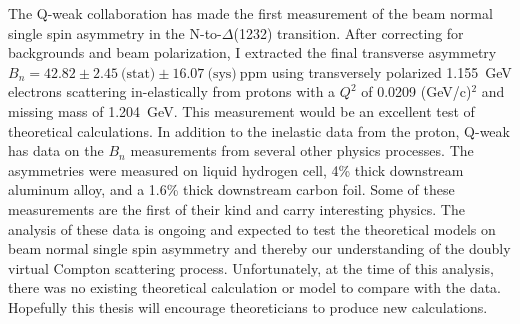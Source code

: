 The Q-weak collaboration has made the first measurement of the beam normal single spin asymmetry in the N-to-$\Delta$(1232) transition. After correcting for backgrounds and beam polarization, I extracted the final transverse asymmetry $B_{n} = 42.82 \pm 2.45~\text{(stat)} \pm 16.07~\text{(sys)}~\text{ppm}$ using transversely polarized 1.155~GeV electrons scattering in-elastically from protons with a $Q^{2}$ of 0.0209 (GeV/c)$^{2}$ and missing mass of 1.204~GeV. This measurement would be an excellent test of theoretical calculations. 
In addition to the inelastic data from the proton, Q-weak has data on the $B_{n}$ measurements from several other physics processes. 
The asymmetries were measured on liquid hydrogen cell, 4\% thick downstream aluminum alloy, and a 1.6\% thick downstream carbon foil. 
Some of these measurements are the first of their kind and carry interesting physics. 
The analysis of these data is ongoing and expected to test the theoretical models on beam normal single spin asymmetry and thereby our understanding of the doubly virtual Compton scattering process. 
Unfortunately, at the time of this analysis, there was no existing theoretical calculation or model to compare with the data. Hopefully this thesis will encourage theoreticians to produce new calculations. 

%
